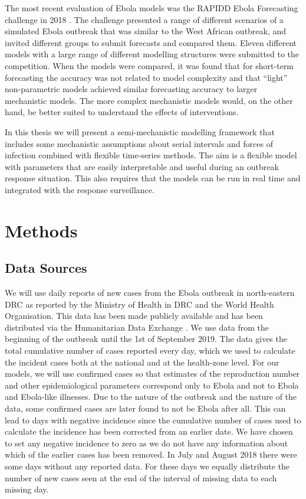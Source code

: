 \documentclass[12pt]{article}
\begin{document}
The most recent evaluation of Ebola models was the RAPIDD Ebola Forecasting challenge in 2018 \cite{viboudRAPIDDEbolaForecasting2018}. The challenge presented a range of different scenarios of a simulated Ebola outbreak that was similar to the West African outbreak, and invited different groups to submit forecasts and compared them. Eleven different models with a large range of different modelling structures were submitted to the competition. When the models were compared, it was found that for short-term forecasting the accuracy was not related to model complexity and that ``light'' non-parametric models achieved similar forecasting accuracy to larger mechanistic models. The more complex mechanistic models would, on the other hand, be better suited to understand the effects of interventions. 

In this thesis we will present a semi-mechanistic modelling framework that includes some mechanistic assumptions about serial intervals and forces of infection combined with flexible time-series methods. The aim is a flexible model with parameters that are easily interpretable and useful during an outbreak response situation. This also requires that the models can be run in real time and integrated with the response surveillance. 

\section{Methods}

\subsection{Data Sources}

We will use daily reports of new cases from the Ebola outbreak in north-eastern DRC as reported by the Ministry of Health in DRC and the World Health Organisation. This data has been made publicly available and has been distributed via the Humanitarian Data Exchange \cite{hummanitariandataexchangeEbolaCasesDeaths}. We use data from the beginning of the outbreak until the 1st of September 2019. The data gives the total cumulative number of cases reported every day, which we used to calculate the incident cases both at the national and at the health-zone level. For our models, we will use confirmed cases so that estimates of the reproduction number and other epidemiological parameters correspond only to Ebola and not to Ebola and Ebola-like illnesses. Due to the nature of the outbreak and the nature of the data, some confirmed cases are later found to not be Ebola after all. This can lead to days with negative incidence since the cumulative number of cases used to calculate the incidence has been corrected from an earlier date. We have chosen to set any negative incidence to zero as we do not have any information about which of the earlier cases has been removed. In July and August 2018 there were some days without any reported data. For these days we equally distribute the number of new cases seen at the end of the interval of missing data to each missing day.
\end{document}

